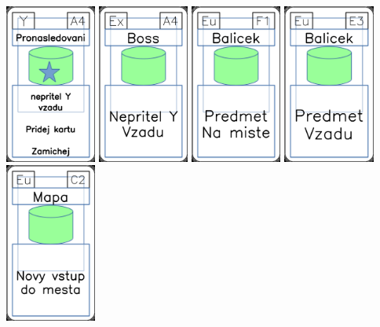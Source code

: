 \documentclass[a4paper]{article}
\begin{document}
	\includegraphics[width=3.0cm]{img-5_33}
	\includegraphics[width=3.0cm]{img-4_3}
	\includegraphics[width=3.0cm]{img-4_25}
	\includegraphics[width=3.0cm]{img-4_22}
	\includegraphics[width=3.0cm]{img-4_41}
\end{document}

